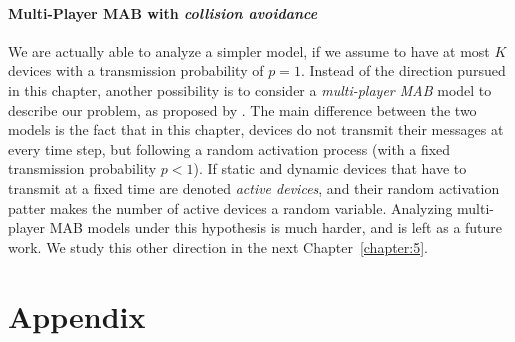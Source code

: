 \paragraph{Multi-Player MAB with \emph{collision avoidance}}

We are actually able to analyze a simpler model, if we assume to have at most $K$ devices with a transmission probability of $p=1$.
Instead of the direction pursued in this chapter, another possibility is to consider a \emph{multi-player MAB} model to describe our problem, as proposed by \cite{Zhao10}.
%
The main difference between the two models is the fact that in this chapter, devices do not transmit their messages at every time step, but following a random activation process (with a fixed transmission probability $p < 1$).
If static and dynamic devices that have to transmit at a fixed time are denoted \emph{active devices},
and their random activation patter makes the number of active devices a random variable.
Analyzing multi-player MAB models under this hypothesis is much harder, and is left as a future work.
%
We study this other direction in the next Chapter~\ref{chapter:5}.


\newpage
\section{Appendix}
\label{sec:4:appendix}
\label{sec:5:proofLagrangian}



